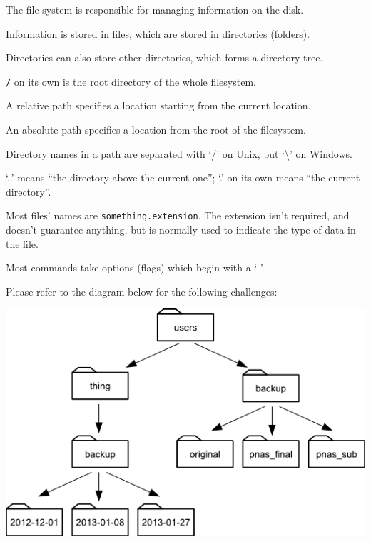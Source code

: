 \documentclass{book}
\begin{document}
\begin{keypoints}
\begin{swcitemize}
\item
  The file system is responsible for managing information on the disk.
\item
  Information is stored in files, which are stored in directories
  (folders).
\item
  Directories can also store other directories, which forms a directory
  tree.
\item
  \texttt{/} on its own is the root directory of the whole filesystem.
\item
  A relative path specifies a location starting from the current
  location.
\item
  An absolute path specifies a location from the root of the filesystem.
\item
  Directory names in a path are separated with `/' on Unix, but
  `\textbackslash{}' on Windows.
\item
  `..' means ``the directory above the current one''; `.' on its own
  means ``the current directory''.
\item
  Most files' names are \texttt{something.extension}. The extension
  isn't required, and doesn't guarantee anything, but is normally used
  to indicate the type of data in the file.
\item
  Most commands take options (flags) which begin with a `-'.
\end{swcitemize}
\end{keypoints}

Please refer to the diagram below for the following challenges:

\includegraphics{novice/shell/img/filesystem-challenge.png}
\end{document}
